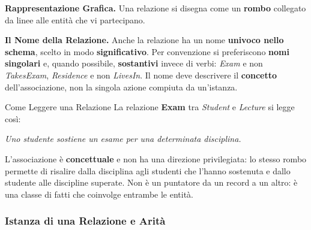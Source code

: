 \documentclass[12pt]{extarticle}
\begin{document}
\medskip
\noindent \textbf{Rappresentazione Grafica.} Una relazione si disegna come un \textbf{rombo} collegato da linee alle entità che vi partecipano.

\begin{center}
\end{center}

\medskip
\noindent \textbf{Il Nome della Relazione.} Anche la relazione ha un nome \textbf{univoco nello schema}, scelto in modo \textbf{significativo}. Per convenzione si preferiscono \textbf{nomi singolari} e, quando possibile, \textbf{sostantivi} invece di verbi: \textit{Exam} e non \textit{TakesExam}, \textit{Residence} e non \textit{LivesIn}. Il nome deve descrivere il \textbf{concetto} dell'associazione, non la singola azione compiuta da un'istanza.

\begin{cbox}{Come Leggere una Relazione}
\noindent La relazione \textbf{Exam} tra \textit{Student} e \textit{Lecture} si legge così:
\begin{center}
\textit{Uno studente sostiene un esame per una determinata disciplina.}
\end{center}
L'associazione è \textbf{concettuale} e non ha una direzione privilegiata: lo stesso rombo permette di risalire dalla disciplina agli studenti che l'hanno sostenuta e dallo studente alle discipline superate. Non è un puntatore da un record a un altro: è una classe di fatti che coinvolge entrambe le entità.
\end{cbox}

\subsubsection{Istanza di una Relazione e Arità}
\end{document}
